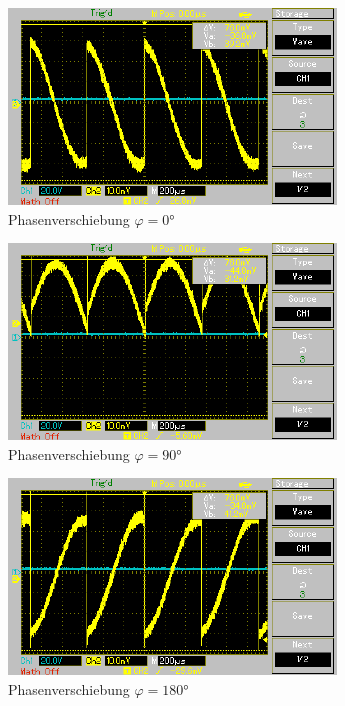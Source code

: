 \begin{figure}
    \begin{subfigure}{0.48\textwidth}
        \centering
        \includegraphics{./content/Oszilloskop_0.pdf}
        \caption{Phasenverschiebung $\varphi = 0°$}
        \label{fig:0deg}
    \end{subfigure}
    \hfill
    \begin{subfigure}{0.48\textwidth}
        \centering
        \includegraphics{./content/Oszilloskop_90.pdf}
        \caption{Phasenverschiebung $\varphi = 90°$}
        \label{fig:90deg}
    \end{subfigure}
    \hfill
    \begin{subfigure}{0.48\textwidth}
        \centering
        \includegraphics{./content/Oszilloskop_180.pdf}
        \caption{Phasenverschiebung $\varphi = 180°$}
        \label{fig:180deg}
    \end{subfigure}
    \hfill
    \begin{subfigure}{0.48\textwidth}

\end{subfigure}
\end{figure}
